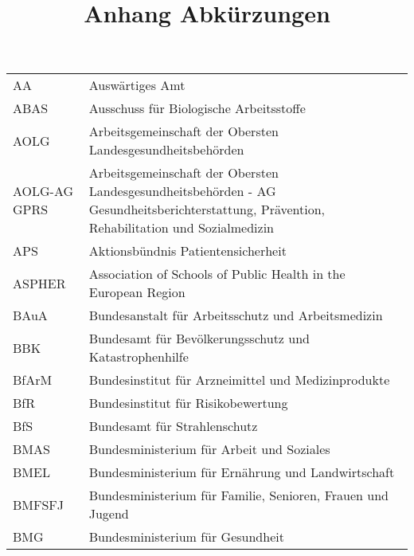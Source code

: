 \documentclass{article}
\begin{document}
\title{Anhang Abkürzungen}

\maketitle


\begin{tabu} to \textwidth { |X|X| }
\hline



AA & Auswärtiges Amt
 \\


ABAS & Ausschuss für Biologische Arbeitsstoffe
 \\


AOLG & Arbeitsgemeinschaft der Obersten Landesgesundheitsbehörden
 \\


AOLG-AG GPRS & Arbeitsgemeinschaft der Obersten Landesgesundheitsbehörden - AG Gesundheitsberichterstattung, Prävention, Rehabilitation und Sozialmedizin
 \\


APS & Aktionsbündnis Patientensicherheit
 \\


ASPHER & Association of Schools of Public Health in the European Region
 \\


BAuA & Bundesanstalt für Arbeitsschutz und Arbeitsmedizin
 \\


BBK & Bundesamt für Bevölkerungsschutz und Katastrophenhilfe
 \\


BfArM & Bundesinstitut für Arzneimittel und Medizinprodukte
 \\


BfR & Bundesinstitut für Risikobewertung
 \\


BfS & Bundesamt für Strahlenschutz
 \\


BMAS & Bundesministerium für Arbeit und Soziales
 \\


BMEL & Bundesministerium für Ernährung und Landwirtschaft
 \\


BMFSFJ & Bundesministerium für Familie, Senioren, Frauen und Jugend
 \\


BMG & Bundesministerium für Gesundheit
 \\



\end{tabu}
\end{document}
